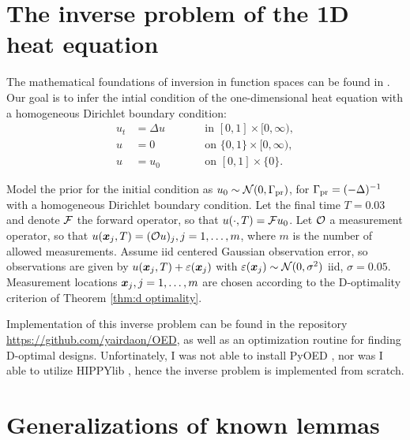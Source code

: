 \appendix
\section{The inverse problem of the 1D heat equation}\label{section:example}
The mathematical foundations of inversion in function spaces can be
found in \cite{Stuart10}. Our goal is to infer the intial condition of
the one-dimensional heat equation with a homogeneous Dirichlet
boundary condition:
\begin{subequations}\label{eq:heat equation}
  \begin{alignat}{2}
    u_t &= \Delta u &&\qquad \text{in } [0,1] \times [0,\infty),\\
      u &= 0 &&\qquad \text{on } \{0, 1\} \times [0,\infty),\\
        u &= u_0 &&\qquad \text{on }[0,1] \times \{0\}.
  \end{alignat}
\end{subequations}

Model the prior for the initial condition as $u_0 \sim
\mathcal{N}(0,\Gamma_{\textup{pr}})$, for $\Gamma_{\textup{pr}} = (-\Delta)^{-1}$ with a homogeneous
Dirichlet boundary condition. Let the final time $T = 0.03$ and denote
$\mathcal{F}$ the forward operator, so that $u(\cdot, T) = \mathcal{F} u_0$. Let
$\mathcal{O}$ a measurement operator, so that $u({\boldsymbol{x}}_j,T) = (\mathcal{O} u)_j,
j=1,\dots,m$, where $m$ is the number of allowed measurements. Assume
iid centered Gaussian observation error, so observations are given by
$u({\boldsymbol{x}}_j,T) + \varepsilon({\boldsymbol{x}}_j)$ with $\varepsilon({\boldsymbol{x}}_j) \sim \mathcal{N}(0, \sigma^2)$
iid, $\sigma = 0.05$. Measurement locations ${\boldsymbol{x}}_j,j=1,\dots,m$ are
chosen according to the D-optimality criterion of Theorem \ref{thm:d
optimality}.

Implementation of this inverse problem can be found in the
repository \url{https://github.com/yairdaon/OED}, as well as an
optimization routine for finding D-optimal designs. Unfortinately, I
was not able to install PyOED \cite{attia2023pyoed}, nor was I able to
utilize HIPPYlib \cite{VillaPetraGhattas16, VillaPetraGhattas18,
VillaPetraGhattas21}, hence the inverse problem is implemented from
scratch.

\section{Generalizations of known lemmas}

